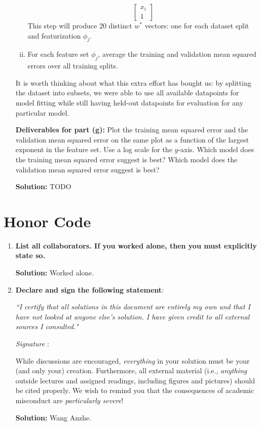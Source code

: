 \documentclass{article}
\newcommand{\Question}[1]{\Large \section{ #1 } \normalsize}
\newenvironment{solution}{\color{blue} \smallskip \textbf{Solution:}}{}
\begin{document}
\begin{enumerate}[(a)]
\begin{enumerate}[(i)]
\[\begin{bmatrix}
                x_i \\
                1
            \end{bmatrix}
        \]
        This step will produce 20 distinct $w^*$ vectors: one for each dataset split and featurization $\phi_j$.        
        \item 
        For each feature set $\phi_j$, average the training and validation mean squared errors over all training splits.
    \end{enumerate}
    It is worth thinking about what this extra effort has bought us: by splitting the dataset into subsets, we were able to use all available datapoints for model fitting while still having held-out datapoints for evaluation for any particular model.

    \textbf{Deliverables for part (g):} Plot the training mean squared error and the validation mean squared error on the same plot as a function of the largest exponent in the feature set. 
    Use a log scale for the $y$-axis.
    Which model does the training mean squared error suggest is best? 
    Which model does the validation mean squared error suggest is best?

    \begin{solution}
        TODO
    \end{solution}
    
\end{enumerate}

\newpage
\Question{Honor Code}

\begin{enumerate}
    \item 
    \textbf{List all collaborators. If you worked alone, then you must explicitly state so.}

    \begin{solution}
        Worked alone.
    \end{solution}

    \item
    \textbf{Declare and sign the following statement}: 
    
    \textit{``I certify that all solutions in this document are entirely my own and that I have not looked at anyone else's solution. I have given credit to all external sources I consulted."}
    
    \textit{Signature} : \hrulefill
    
    While discussions are encouraged, \emph{everything} in your solution must be your (and only your) creation. 
    Furthermore, all external material  (i.e., \emph{anything} outside lectures and assigned
    readings, including figures and pictures) should be cited properly.
    We wish to remind you that the consequences of academic misconduct are \emph{particularly severe}!

    \begin{solution}
        Wang Anzhe.
    \end{solution}

\end{enumerate}
\end{document}
